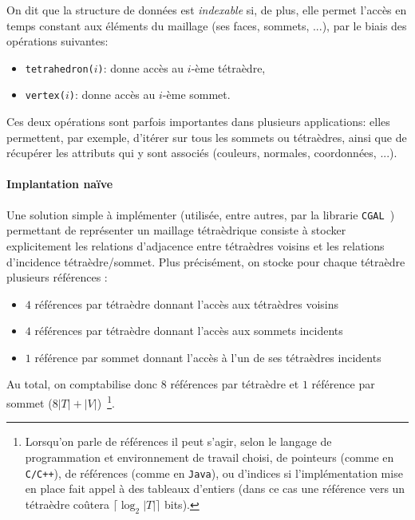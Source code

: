 On dit que la structure de données est \emph{indexable} si, de plus, elle permet l'accès en temps constant aux éléments du maillage (ses faces, sommets, ...), par le biais des opérations suivantes:
\begin{itemize}
\item \texttt{tetrahedron($i$)}: donne accès au $i$-ème tétraèdre,
\item \texttt{vertex($i$)}: donne accès au $i$-ème sommet.
\end{itemize}
Ces deux opérations sont parfois importantes dans plusieurs applications: elles permettent, par exemple, d'itérer sur tous les sommets ou tétraèdres,
ainsi que de récupérer les attributs qui y sont associés (couleurs, normales, coordonnées, ...).

\paragraph{Implantation naïve}
Une solution simple à implémenter (utilisée, entre autres, par la librarie \texttt{CGAL}~\cite{CGAL}) permettant de représenter un maillage tétraèdrique consiste à stocker explicitement les relations d'adjacence entre tétraèdres voisins et les relations d'incidence tétraèdre/sommet. Plus précisément, on stocke pour chaque tétraèdre plusieurs références : 
\begin{itemize}
\item $4$ références par tétraèdre donnant l'accès aux tétraèdres voisins
\item $4$ références par tétraèdre donnant l'accès aux sommets incidents
\item $1$ référence par sommet donnant l'accès à l'un de ses tétraèdres incidents
\end{itemize}
Au total, on comptabilise donc $8$ références par tétraèdre et $1$ référence par sommet ($8|T|+|V|$)~\footnote{Lorsqu'on parle de références il peut s'agir, selon le langage de programmation et environnement de travail choisi, de pointeurs (comme en \texttt{C/C++}), 
de références (comme en \texttt{Java}), ou d'indices si l'implémentation mise en place fait appel à des tableaux d'entiers (dans ce cas une référence vers un tétraèdre co\^utera
$\lceil\log_2 |T|\rceil$ bits).}.